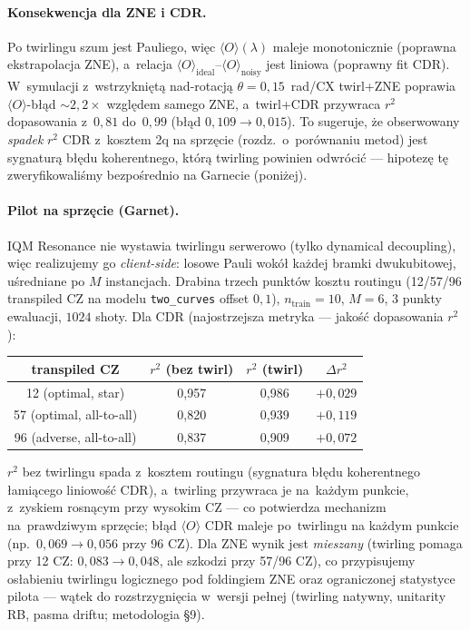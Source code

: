 \documentclass[11pt,a4paper]{article}
\begin{document}
\paragraph{Konsekwencja dla ZNE i CDR.} Po twirlingu szum jest Pauliego, więc
$\langle O\rangle(\lambda)$ maleje monotonicznie (poprawna ekstrapolacja ZNE), a~relacja
$\langle O\rangle_{\text{ideal}}$–$\langle O\rangle_{\text{noisy}}$ jest liniowa
(poprawny fit CDR). W~symulacji z~wstrzykniętą nad-rotacją $\theta=0{,}15$~rad/CX
twirl+ZNE poprawia $\langle O\rangle$-błąd $\sim2{,}2\times$ względem samego ZNE, a~twirl+CDR
przywraca $r^2$ dopasowania z~$0{,}81$ do~$0{,}99$ (błąd $0{,}109\!\to\!0{,}015$).
To sugeruje, że obserwowany \emph{spadek} $r^2$ CDR z~kosztem 2q na sprzęcie
(rozdz.~o~porównaniu metod) jest sygnaturą błędu koherentnego, którą twirling
powinien odwrócić --- hipotezę tę zweryfikowaliśmy bezpośrednio na Garnecie (poniżej).

\paragraph{Pilot na sprzęcie (Garnet).} IQM Resonance nie wystawia twirlingu serwerowo (tylko
dynamical decoupling), więc realizujemy go \emph{client-side}: losowe Pauli wokół każdej bramki
dwukubitowej, uśredniane po $M$ instancjach. Drabina trzech punktów kosztu routingu (12/57/96
transpiled CZ na modelu \texttt{two\_curves} offset $0{,}1$), $n_{\text{train}}=10$, $M=6$, $3$
punkty ewaluacji, $1024$ shoty. Dla CDR (najostrzejsza metryka --- jakość dopasowania $r^2$):
\begin{center}
\begin{tabular}{cccc}
\toprule
transpiled CZ & $r^2$ (bez twirl) & $r^2$ (twirl) & $\Delta r^2$ \\
\midrule
12 (optimal, star)       & 0{,}957 & 0{,}986 & $+0{,}029$ \\
57 (optimal, all-to-all) & 0{,}820 & 0{,}939 & $+0{,}119$ \\
96 (adverse, all-to-all) & 0{,}837 & 0{,}909 & $+0{,}072$ \\
\bottomrule
\end{tabular}
\end{center}
$r^2$ bez twirlingu spada z~kosztem routingu (sygnatura błędu koherentnego łamiącego liniowość
CDR), a~twirling przywraca je na~każdym punkcie, z~zyskiem rosnącym przy wysokim CZ --- co
potwierdza mechanizm na~prawdziwym sprzęcie; błąd $\langle O\rangle$ CDR maleje po~twirlingu na
każdym punkcie (np.\ $0{,}069\!\to\!0{,}056$ przy 96 CZ). Dla ZNE wynik jest \emph{mieszany}
(twirling pomaga przy 12 CZ: $0{,}083\!\to\!0{,}048$, ale szkodzi przy 57/96 CZ), co przypisujemy
osłabieniu twirlingu logicznego pod foldingiem ZNE oraz ograniczonej statystyce pilota --- wątek
do rozstrzygnięcia w~wersji pełnej (twirling natywny, unitarity RB, pasma driftu; metodologia §9).
\end{document}
